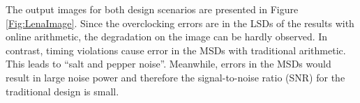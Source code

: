 \documentclass{acm_proc_article-sp}
\begin{document}
The output images for both design scenarios are presented in Figure \ref{Fig:LenaImage}. Since the overclocking errors are in the LSDs of the results with online arithmetic, the degradation on the image can be hardly observed. In contrast, timing violations cause error in the MSDs with traditional arithmetic. This leads to ``salt and pepper noise''. Meanwhile, errors in the MSDs would result in large noise power and therefore the signal-to-noise ratio (SNR) for the traditional design is small.

\begin{figure}[htb]
  \vspace{-2.5ex}
  \centering
  \vspace{-1ex}
\end{figure}
\end{document}
